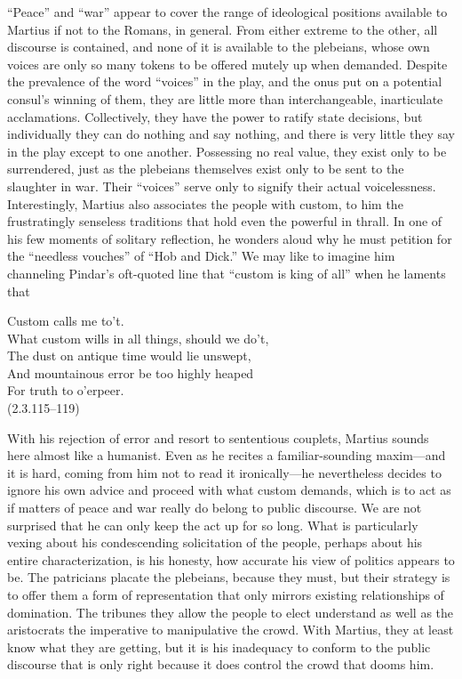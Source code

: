 ``Peace'' and ``war'' appear to cover the range of ideological positions available to Martius if not to the Romans, in general.
From either extreme to the other, all discourse is contained, and none of it is available to the plebeians, whose own voices are only so many tokens to be offered mutely up when demanded.
Despite the prevalence of the word ``voices'' in the play, and the onus put on a potential consul's winning of them, they are little more than interchangeable, inarticulate acclamations.
Collectively, they have the power to ratify state decisions, but individually they can do nothing and say nothing, and there is very little they say in the play except to one another.
Possessing no real value, they exist only to be surrendered, just as the plebeians themselves exist only to be sent to the slaughter in war.
Their ``voices'' serve only to signify their actual voicelessness.
Interestingly, Martius also associates the people with custom, to him the frustratingly senseless traditions that hold even the powerful in thrall.
In one of his few moments of solitary reflection, he wonders aloud why he must petition for the ``needless vouches'' of ``Hob and Dick.''
We may like to imagine him channeling Pindar's oft-quoted line that ``custom is king of all'' when he laments that
\begin{vq}
Custom calls me to't.\\
What custom wills in all things, should we do't,\\
The dust on antique time would lie unswept,\\
And mountainous error be too highly heaped\\
For truth to o'erpeer.\\
\hfill(2.3.115--119)
\end{vq}
With his rejection of error and resort to sententious couplets, Martius sounds here almost like a humanist.
Even as he recites a familiar-sounding maxim---and it is hard, coming from him not to read it ironically---he nevertheless decides to ignore his own advice and proceed with what custom demands, which is to act as if matters of peace and war really do belong to public discourse.
We are not surprised that he can only keep the act up for so long.
What is particularly vexing about his condescending solicitation of the people, perhaps about his entire characterization, is his honesty, how accurate his view of politics appears to be.
The patricians placate the plebeians, because they must, but their strategy is to offer them a form of representation that only mirrors existing relationships of domination.
The tribunes they allow the people to elect understand as well as the aristocrats the imperative to manipulative the crowd.
With Martius, they at least know what they are getting, but it is his inadequacy to conform to the public discourse that is only right because it does control the crowd that dooms him.

